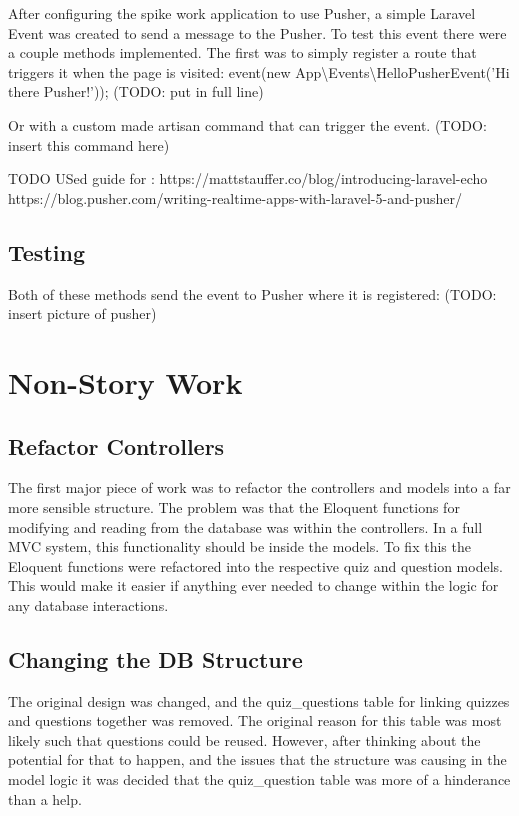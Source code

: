 \documentclass{article}
\begin{document}
After configuring the spike work application to use Pusher, a simple Laravel Event was created to send a message to the Pusher. To test this event there were a couple methods implemented. The first was to simply register a route that triggers it when the page is visited: 
	event(new App\textbackslash Events\textbackslash HelloPusherEvent('Hi there Pusher!')); (TODO: put in full line)
 
Or with a custom made artisan command that can trigger the event. (TODO: insert this command here)

TODO USed guide for : https://mattstauffer.co/blog/introducing-laravel-echo https://blog.pusher.com/writing-realtime-apps-with-laravel-5-and-pusher/
 
\subsection{Testing}
Both of these methods send the event to Pusher where it is registered: (TODO: insert picture of pusher)
\newpage

\section{Non-Story Work}
\subsection{Refactor Controllers}
The first major piece of work was to refactor the controllers and models into a far more sensible structure. The problem was that the Eloquent functions for modifying and reading from the database was within the controllers. In a full MVC system, this functionality should be inside the models. To fix this the Eloquent functions were refactored into the respective quiz and question models. This would make it easier if anything ever needed to change within the logic for any database interactions.
\subsection{Changing the DB Structure}
The original design was changed, and the quiz\_questions table for linking quizzes and questions together was removed. The original reason for this table was most likely such that questions could be reused. However, after thinking about the potential for that to happen, and the issues that the structure was causing in the model logic it was decided that the quiz\_question table was more of a hinderance than a help.
\end{document}
